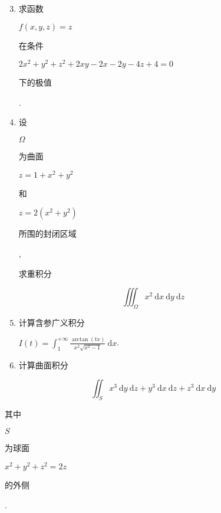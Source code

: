 \documentclass[10pt]{article}
\begin{document}
\begin{enumerate}
  \setcounter{enumi}{2}
  \item \begin{CJK}{UTF8}{mj}求函数\end{CJK} $f(x, y, z)=z$ \begin{CJK}{UTF8}{mj}在条件\end{CJK} $2 x^{2}+y^{2}+z^{2}+2 x y-2 x-2 y-4 z+4=0$ \begin{CJK}{UTF8}{mj}下的极值\end{CJK}.

  \item \begin{CJK}{UTF8}{mj}设\end{CJK} $\Omega$ \begin{CJK}{UTF8}{mj}为曲面\end{CJK} $z=1+x^{2}+y^{2}$ \begin{CJK}{UTF8}{mj}和\end{CJK} $z=2\left(x^{2}+y^{2}\right)$ \begin{CJK}{UTF8}{mj}所围的封闭区域\end{CJK}, \begin{CJK}{UTF8}{mj}求重积分\end{CJK}

\end{enumerate}
$$
\iiint_{\Omega} x^{2} \mathrm{~d} x \mathrm{~d} y \mathrm{~d} z
$$

\begin{enumerate}
  \setcounter{enumi}{4}
  \item \begin{CJK}{UTF8}{mj}计算含参广义积分\end{CJK} $I(t)=\int_{1}^{+\infty} \frac{\arctan (t x)}{x^{2} \sqrt{x^{2}-1}} \mathrm{~d} x$.

  \item \begin{CJK}{UTF8}{mj}计算曲面积分\end{CJK}

\end{enumerate}
$$
\iint_{S} x^{3} \mathrm{~d} y \mathrm{~d} z+y^{3} \mathrm{~d} x \mathrm{~d} z+z^{3} \mathrm{~d} x \mathrm{~d} y
$$
\begin{CJK}{UTF8}{mj}其中\end{CJK} $S$ \begin{CJK}{UTF8}{mj}为球面\end{CJK} $x^{2}+y^{2}+z^{2}=2 z$ \begin{CJK}{UTF8}{mj}的外侧\end{CJK}.
\end{document}
